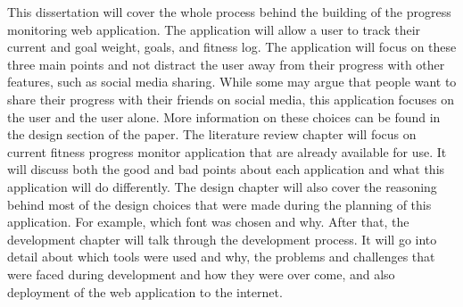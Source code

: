 This dissertation will cover the whole process behind the building of the progress monitoring web application. The application will allow a user to track their current and goal weight, goals, and fitness log. The application will focus on these three main points and not distract the user away from their progress with other features, such as social media sharing. While some may argue that people want to share their progress with their friends on social media, this application focuses on the user and the user alone. More information on these choices can be found in the design section of the paper. The literature review chapter will focus on current fitness progress monitor application that are already available for use. It will discuss both the good and bad points about each application and what this application will do differently. The design chapter will also cover the reasoning behind most of the design choices that were made during the planning of this application. For example, which font was chosen and why. After that, the development chapter will talk through the development process. It will go into detail about which tools were used and why, the problems and challenges that were faced during development and how they were over come, and also deployment of the web application to the internet. 